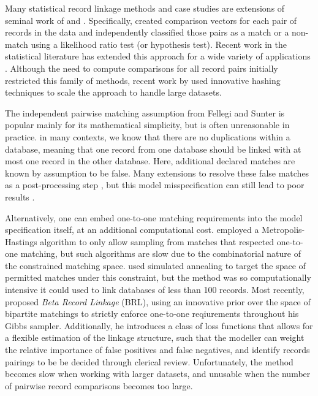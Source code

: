 \documentclass[12pt,letterpaper]{article}
\newcommand{\1}[1]{\mathbb{I}\!\left[#1\right]} %
\begin{document}
{	Many statistical record linkage methods and case studies are extensions of seminal work of \cite{fellegi_theory_1969} and \cite{newcombe_automatic_1959}. Specifically, \cite{fellegi_theory_1969} created comparison vectors for each pair of records in the data and independently classified those pairs as a match or a non-match using a likelihood ratio test (or hypothesis test). Recent work in the statistical literature has extended this approach for a wide variety of applications \citep{winkler1991application, fair2004generalized, wagner2014person, gill2003english}. Although the need to compute comparisons for all record pairs initially restricted this family of methods, recent work by \cite{enamorado2019using} used innovative hashing techniques to scale the approach to handle large datasets.
	
	The independent pairwise matching assumption from Fellegi and Sunter is popular mainly for its mathematical simplicity, but is often unreasonable in practice. in many contexts, we know that there are no duplications within a database, meaning that one record from one database should be linked with at most one record in the other database. Here, additional declared matches are known by assumption to be false. Many extensions to \cite{fellegi_theory_1969} resolve these false matches as a post-processing step \citep{jaro1989, enamorado2019using}, but this model misspecification can still lead to poor results \cite{sadinle_bayesian_2017}.
	
	Alternatively, one can embed one-to-one matching requirements into the model specification itself, at an additional computational cost. \cite{larsen2005} employed a Metropolis-Hastings algorithm to only allow sampling from matches that respected one-to-one matching, but such algorithms are slow due to the combinatorial nature of the constrained matching space. \cite{fortunato_2010} used simulated annealing to target the space of permitted matches under this constraint, but the method was so computationally intensive it could used to link databases of less than 100 records. Most recently, \cite{sadinle_bayesian_2017} proposed \emph{Beta Record Linkage} (BRL), using an innovative prior over the space of bipartite matchings to strictly enforce one-to-one reqiurements throughout his Gibbs sampler. Additionally, he introduces a class of loss functions that allows for a flexible estimation of the linkage structure, such that the modeller can weight the relative importance of false positives and false negatives, and identify records pairings to be be decided through clerical review. Unfortunately, the method becomes slow when working with larger datasets, and unusable when the number of pairwise record comparisons becomes too large. 
	
}
\end{document}
